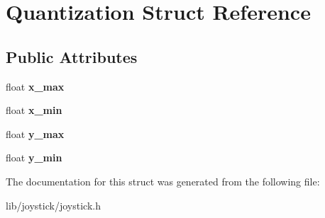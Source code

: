 \hypertarget{struct_quantization}{}\section{Quantization Struct Reference}
\label{struct_quantization}
\subsection*{Public Attributes}
\begin{DoxyCompactItemize}
\item 
\hypertarget{struct_quantization_a49ed52aa6f82f23bd57d2213ec8f4132}{}\label{struct_quantization_a49ed52aa6f82f23bd57d2213ec8f4132} 
float {\bfseries x\+\_\+max}
\item 
\hypertarget{struct_quantization_a6239395ee60948e02b37d5eee8714a67}{}\label{struct_quantization_a6239395ee60948e02b37d5eee8714a67} 
float {\bfseries x\+\_\+min}
\item 
\hypertarget{struct_quantization_ab49ddf34f17534a7db9b25a77970d9a3}{}\label{struct_quantization_ab49ddf34f17534a7db9b25a77970d9a3} 
float {\bfseries y\+\_\+max}
\item 
\hypertarget{struct_quantization_a390def64c5c6aeffffe43fdecc989579}{}\label{struct_quantization_a390def64c5c6aeffffe43fdecc989579} 
float {\bfseries y\+\_\+min}
\end{DoxyCompactItemize}


The documentation for this struct was generated from the following file\+:\begin{DoxyCompactItemize}
\item 
lib/joystick/joystick.\+h\end{DoxyCompactItemize}

